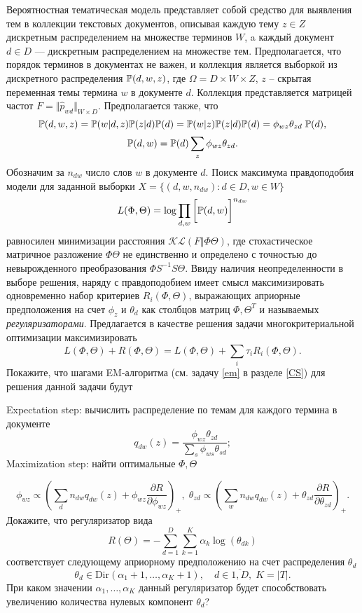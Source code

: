 \begin{problem}
\label{sec:them_modeling}
Вероятностная тематическая модель представляет собой средство для выявления тем в коллекции текстовых документов, описывая каждую тему $z \in Z$ дискретным распределением на множестве терминов $W$, a каждый документ $d \in D$  — дискретным распределением на множестве тем. Предполагается, что порядок терминов в документах не важен, и коллекция является  выборкой из дискретного распределения $\mathrm{{\mathbb P}}(d, w, z)$, где  $\Omega = D \times W \times Z$,  $z$ -- скрытая переменная темы термина $w$ в документе $d$. Коллекция представляется матрицей частот $F  
 = \Vert \widehat{p}_{wd} \Vert_{W\times D}$. Предполагается также, что
\[
\mathrm{{\mathbb P}}(d, w, z) = \mathrm{{\mathbb P}}(w|d,z)\mathrm{{\mathbb P}}(z|d)\mathrm{{\mathbb P}}(d) = \mathrm{{\mathbb P}}(w|z)\mathrm{{\mathbb P}}(z|d)  \mathrm{{\mathbb P}}(d) 
= \phi_{wz} \theta_{zd} \; \mathrm{{\mathbb P}}(d), 
\]  
\[
 \mathrm{{\mathbb P}}(d, w) = \mathrm{{\mathbb P}}(d) \sum_z \phi_{wz} \theta_{zd} . 
\]
Обозначим за $n_{dw}$ число слов $w$ в документе $d$.
Поиск максимума правдоподобия модели для заданной выборки $X = \{(d,w, n_{dw}): d \in D, w \in W\}$  
\[
 L(\Phi, \Theta) = \log  \prod_{d,w} \bigg[\mathrm{{\mathbb P}}(d, w)\bigg]^{n_{dw}}
\] 
 равносилен минимизации расстояния $\mathcal{KL}(F \Vert \Phi \Theta)$, где стохастическое матричное разложение $\Phi \Theta$ не единственно и определено с точностью до невырожденного преобразования $\Phi S^{-1}  S \Theta$.
Ввиду наличия неопределенности в выборе решения, наряду с правдоподобием имеет смысл максимизировать одновременно набор критериев $R_i(\Phi, \Theta)$, выражающих априорные предположения на счет $\phi_z$ и $\theta_d$ как столбцов матриц $\Phi, \Theta^T$ и называемых \textit{регуляризаторами}. Предлагается в качестве решения задачи многокритериальной  оптимизации максимизировать
\[
L(\Phi, \Theta) + R(\Phi, \Theta) = L(\Phi, \Theta) + \sum_i \tau_i R_i(\Phi, \Theta).
\]
Покажите, что шагами EM-алгоритма (см. задачу \ref{em} в разделе \ref{CS}) для решения данной задачи будут

Expectation step: вычислить распределение по темам для каждого термина в документе  
\[
q_{dw}(z) = \frac{\phi_{wz} \theta_{zd}}{\sum_s \phi_{ws} \theta_{sd}};
\]
Maximization step:  найти оптимальные  $\Phi, \Theta$

\[
\phi_{wz} \propto \left( 
\sum_d n_{dw} q_{dw}(z)  + \phi_{wz}\frac{\partial R}{\partial \phi_{wz}}
\right)_{+}, \;
\theta_{zd} \propto \left( 
\sum_w n_{dw} q_{dw}(z)  + \theta_{zd}\frac{\partial R}{\partial \theta_{zd}}
\right)_{+}.
\]
Докажите, что регуляризатор вида
\[
R(\Theta) = - \sum_{d=1}^{D}\sum_{k=1}^{K} \alpha_k \log(\theta_{dk})
\]
соответствует следующему априорному предположению на счет распределения $\theta_d$
\[
\theta_d \in \mathrm{Dir}(\alpha_1 + 1,\ldots,\alpha_K + 1),
\quad
d \in \overline{1,D}, \; K = |T|.
\]
При каком значении $\alpha_1,\ldots,\alpha_K$ данный регуляризатор будет способствовать увеличению количества нулевых компонент $\theta_d$?
\end{problem}

